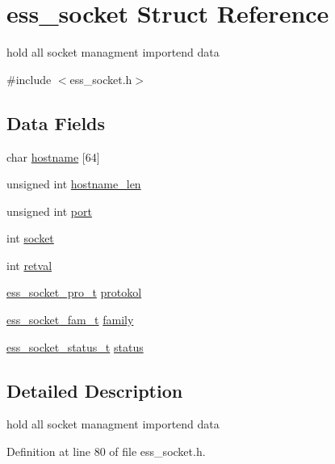 \hypertarget{structess__socket}{}\section{ess\+\_\+socket Struct Reference}
\label{structess__socket}


hold all socket managment importend data  




{\ttfamily \#include $<$ess\+\_\+socket.\+h$>$}

\subsection*{Data Fields}
\begin{DoxyCompactItemize}
\item 
char \hyperlink{structess__socket_a0c6be700c8763c26054098348ebef8d6}{hostname} \mbox{[}64\mbox{]}
\item 
unsigned int \hyperlink{structess__socket_a4d0d74743d167680649419163ce8c80e}{hostname\+\_\+len}
\item 
unsigned int \hyperlink{structess__socket_a938bdc6ae46c346147b6d4f67ad1e704}{port}
\item 
int \hyperlink{structess__socket_a3666576f6b88007cc7b8f26c7da596c8}{socket}
\item 
int \hyperlink{structess__socket_a7f345697df7eb20c9aba1ab6980cae8f}{retval}
\item 
\hyperlink{ess__socket_8h_a1e8e8de805f8e0b7da25e3b177977273}{ess\+\_\+socket\+\_\+pro\+\_\+t} \hyperlink{structess__socket_a1f0429596710512357072b192ba3d2bd}{protokol}
\item 
\hyperlink{ess__socket_8h_a9305eae437d57846661e997bb755d150}{ess\+\_\+socket\+\_\+fam\+\_\+t} \hyperlink{structess__socket_ad09623d57ebd33fef8dac4e18c0cba2f}{family}
\item 
\hyperlink{ess__socket_8h_ae3a6dc482fc34f9ea0361820ba4be573}{ess\+\_\+socket\+\_\+status\+\_\+t} \hyperlink{structess__socket_a4e47521e8af756b9edf77f1f02f9b725}{status}
\end{DoxyCompactItemize}


\subsection{Detailed Description}
hold all socket managment importend data 

Definition at line 80 of file ess\+\_\+socket.\+h.



